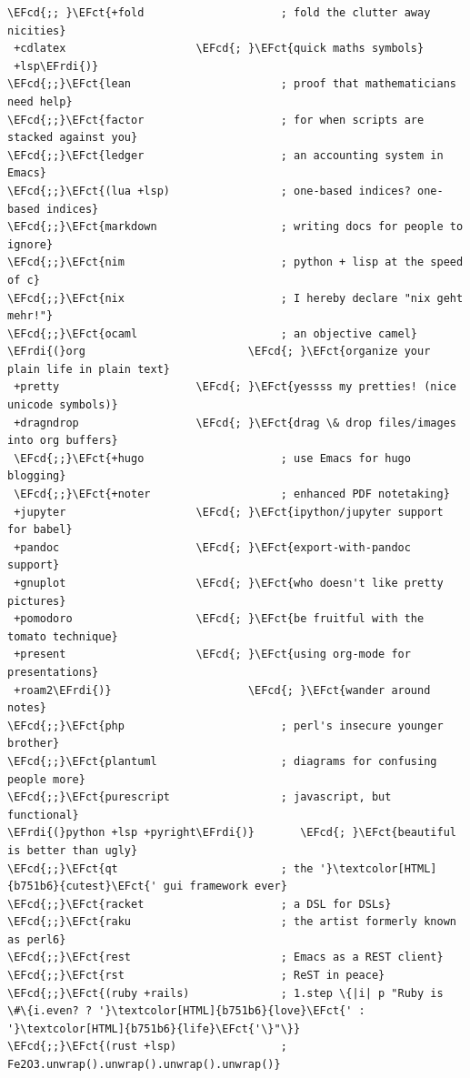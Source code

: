 \documentclass{scrartcl}
\newcommand{\EFct}[1]{\textcolor{EFct}{#1}} %
\newcommand{\EFcd}[1]{\textcolor{EFcd}{#1}} %
\newcommand{\EFrdi}[1]{\textcolor{EFrdi}{#1}} %
\begin{document}
\begin{enumerate}
\begin{Code}
\begin{Verbatim}[]
\EFcd{;; }\EFct{+fold                     ; fold the clutter away nicities}
 +cdlatex                    \EFcd{; }\EFct{quick maths symbols}
 +lsp\EFrdi{)}
\EFcd{;;}\EFct{lean                       ; proof that mathematicians need help}
\EFcd{;;}\EFct{factor                     ; for when scripts are stacked against you}
\EFcd{;;}\EFct{ledger                     ; an accounting system in Emacs}
\EFcd{;;}\EFct{(lua +lsp)                 ; one-based indices? one-based indices}
\EFcd{;;}\EFct{markdown                   ; writing docs for people to ignore}
\EFcd{;;}\EFct{nim                        ; python + lisp at the speed of c}
\EFcd{;;}\EFct{nix                        ; I hereby declare "nix geht mehr!"}
\EFcd{;;}\EFct{ocaml                      ; an objective camel}
\EFrdi{(}org                         \EFcd{; }\EFct{organize your plain life in plain text}
 +pretty                     \EFcd{; }\EFct{yessss my pretties! (nice unicode symbols)}
 +dragndrop                  \EFcd{; }\EFct{drag \& drop files/images into org buffers}
 \EFcd{;;}\EFct{+hugo                     ; use Emacs for hugo blogging}
 \EFcd{;;}\EFct{+noter                    ; enhanced PDF notetaking}
 +jupyter                    \EFcd{; }\EFct{ipython/jupyter support for babel}
 +pandoc                     \EFcd{; }\EFct{export-with-pandoc support}
 +gnuplot                    \EFcd{; }\EFct{who doesn't like pretty pictures}
 +pomodoro                   \EFcd{; }\EFct{be fruitful with the tomato technique}
 +present                    \EFcd{; }\EFct{using org-mode for presentations}
 +roam2\EFrdi{)}                     \EFcd{; }\EFct{wander around notes}
\EFcd{;;}\EFct{php                        ; perl's insecure younger brother}
\EFcd{;;}\EFct{plantuml                   ; diagrams for confusing people more}
\EFcd{;;}\EFct{purescript                 ; javascript, but functional}
\EFrdi{(}python +lsp +pyright\EFrdi{)}       \EFcd{; }\EFct{beautiful is better than ugly}
\EFcd{;;}\EFct{qt                         ; the '}\textcolor[HTML]{b751b6}{cutest}\EFct{' gui framework ever}
\EFcd{;;}\EFct{racket                     ; a DSL for DSLs}
\EFcd{;;}\EFct{raku                       ; the artist formerly known as perl6}
\EFcd{;;}\EFct{rest                       ; Emacs as a REST client}
\EFcd{;;}\EFct{rst                        ; ReST in peace}
\EFcd{;;}\EFct{(ruby +rails)              ; 1.step \{|i| p "Ruby is \#\{i.even? ? '}\textcolor[HTML]{b751b6}{love}\EFct{' : '}\textcolor[HTML]{b751b6}{life}\EFct{'\}"\}}
\EFcd{;;}\EFct{(rust +lsp)                ; Fe2O3.unwrap().unwrap().unwrap().unwrap()}

\end{Verbatim}
\end{Code}
\end{enumerate}
\end{document}
